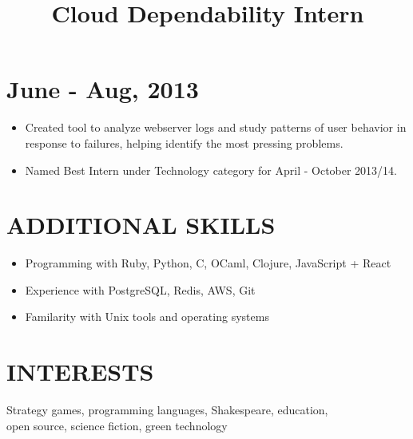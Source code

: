 \documentclass[centered, margin, 10pt]{res} %
\newcommand\mainsectionfont{\normalsize\bf\textup}
\renewcommand\sectionfont{\mainsectionfont} %
\renewcommand\dates{\section} %
\newenvironment{rlist}
    {\begin{minipage}[t]{\linewidth}\begin{itemize}\raggedright}
    {\end{itemize}\end{minipage}}
\newenvironment{positionlist}
    {\begin{position}\begin{rlist}}
    {\end{rlist}\end{position}}
\begin{document}
\begin{resume}
\title{Cloud Dependability Intern}
\dates{June - Aug, 2013}
\begin{positionlist}
  \item Created tool to analyze webserver logs and study patterns of user
    behavior in response to failures, helping identify the most pressing
    problems.
  \item Named Best Intern under Technology category for April - October 2013/14.
\end{positionlist}


\renewcommand\sectionfont{\mainsectionfont} %


\section{ADDITIONAL SKILLS}
\begin{rlist}
  \item Programming with Ruby, Python, C, OCaml, Clojure, JavaScript + React
  \item Experience with PostgreSQL, Redis, AWS, Git
  \item Familarity with Unix tools and operating systems
\end{rlist}


\section{INTERESTS}
Strategy games, programming languages, Shakespeare, education, \\
open source, science fiction, green technology


\end{resume}
\end{document}
